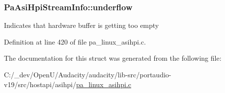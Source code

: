 \subsubsection[{\texorpdfstring{underflow}{underflow}}]{ Pa\+Asi\+Hpi\+Stream\+Info\+::underflow}\hypertarget{struct_pa_asi_hpi_stream_info_af7f47c3fa22d947baddb6d6bfc551963}{}\label{struct_pa_asi_hpi_stream_info_af7f47c3fa22d947baddb6d6bfc551963}
Indicates that hardware buffer is getting too empty 

Definition at line 420 of file pa\+\_\+linux\+\_\+asihpi.\+c.



The documentation for this struct was generated from the following file\+:\begin{DoxyCompactItemize}
\item 
C\+:/\+\_\+dev/\+Open\+U/\+Audacity/audacity/lib-\/src/portaudio-\/v19/src/hostapi/asihpi/\hyperlink{pa__linux__asihpi_8c}{pa\+\_\+linux\+\_\+asihpi.\+c}\end{DoxyCompactItemize}
